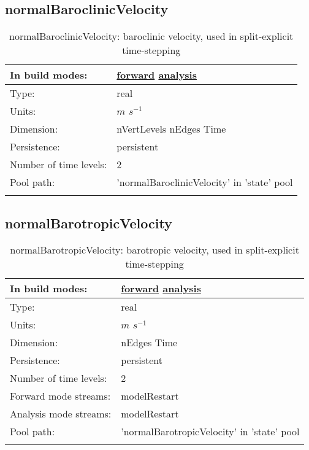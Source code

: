 \subsection[normalBaroclinicVelocity]{normalBaroclinicVelocity}
\label{subsec:var_sec_state_normalBaroclinicVelocity}
\begin{center}
\begin{longtable}{| p{2.0in} | p{4.0in} |}
        \hline 
        In build modes: & \hyperref[subsec:forward_var_tab_state]{forward} \hyperref[subsec:analysis_var_tab_state]{analysis} \\
        \hline 
        Type: & real \\
        \hline 
        Units: & $m$ $s^{-1}$ \\
        \hline 
        Dimension: & nVertLevels nEdges Time \\
        \hline 
        Persistence: & persistent \\
        \hline 
        Number of time levels: & 2 \\
        \hline 
            Pool path: & 'normalBaroclinicVelocity' in 'state' pool
 \\
		 \hline 
    \caption{normalBaroclinicVelocity: baroclinic velocity, used in split-explicit time-stepping}
\end{longtable}
\end{center}
\subsection[normalBarotropicVelocity]{normalBarotropicVelocity}
\label{subsec:var_sec_state_normalBarotropicVelocity}
\begin{center}
\begin{longtable}{| p{2.0in} | p{4.0in} |}
        \hline 
        In build modes: & \hyperref[subsec:forward_var_tab_state]{forward} \hyperref[subsec:analysis_var_tab_state]{analysis} \\
        \hline 
        Type: & real \\
        \hline 
        Units: & $m$ $s^{-1}$ \\
        \hline 
        Dimension: & nEdges Time \\
        \hline 
        Persistence: & persistent \\
        \hline 
        Number of time levels: & 2 \\
        \hline 
		 Forward mode streams: &  modelRestart \\
        \hline 
		 Analysis mode streams: &  modelRestart \\
        \hline 
            Pool path: & 'normalBarotropicVelocity' in 'state' pool
 \\
		 \hline 
    \caption{normalBarotropicVelocity: barotropic velocity, used in split-explicit time-stepping}
\end{longtable}
\end{center}
